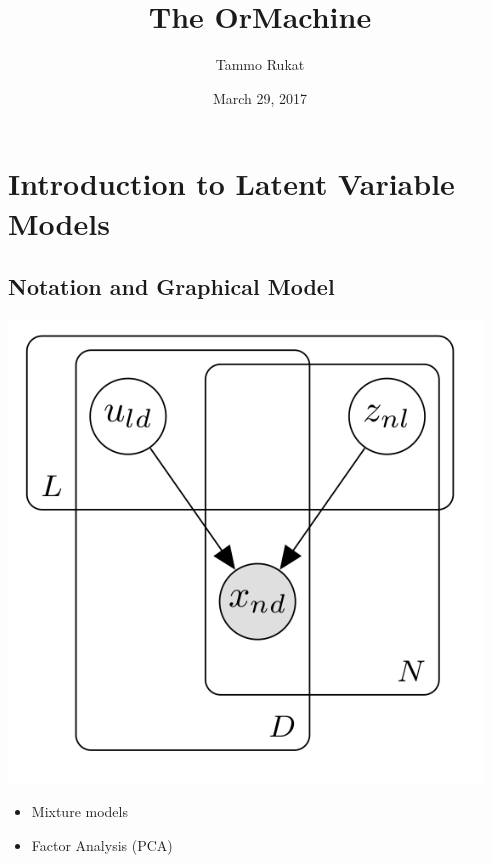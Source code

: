 \documentclass[11pt]{article}
\author{Tammo Rukat}
\date{March 29, 2017}
\title{The OrMachine}
\begin{document}
\maketitle
\setcounter{tocdepth}{1}
\tableofcontents


\section*{Introduction to Latent Variable Models}
\label{sec-1}
\subsection*{Notation and Graphical Model}
\label{sec-1-1}
\includegraphics[width=.9\linewidth]{./plate_model.png}
\begin{itemize}
\item Mixture models
\item Factor Analysis (PCA)
\end{itemize}
\end{document}
